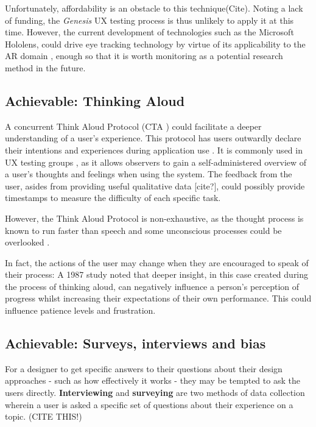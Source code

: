 \documentclass{scrartcl}
\begin{document}
Unfortunately, affordability is an obstacle to this technique(Cite). Noting a lack of funding, the \textit{Genesis} UX testing process is thus unlikely to apply it at this time. However, the current development of technologies such as the Microsoft Hololens, could drive eye tracking technology by virtue of its applicability to the AR domain \cite{majaranta_chapter_2014}, enough so that it is worth monitoring as a potential research method in the future.

\subsection{Achievable: Thinking Aloud}
A concurrent Think Aloud Protocol (CTA \cite{cooke_assessing_2010}) could facilitate a deeper understanding of a user's experience. This protocol has users outwardly declare their intentions and experiences during application use \cite{haak_exploring_2003} \cite{cooke_assessing_2010}. It is commonly used in UX testing groups \cite{mcdonald_exploring_2012}, as it allows observers to gain a self-administered overview of a user's thoughts and feelings when using the system. The feedback from the user, asides from providing useful qualitative data [cite?], could possibly provide timestamps to measure the difficulty of each specific task.

However, the Think Aloud Protocol is non-exhaustive, as the thought process is known to run faster than speech \cite{e._fonteyn_description_1993} and some unconscious processes could be overlooked \cite{cooke_assessing_2010}.

In fact, the actions of the user may change when they are encouraged to speak of their process: A 1987 study \cite{metcalfe_intuition_1987} noted that deeper insight, in this case created during the process of thinking aloud, can negatively influence a person's perception of progress whilst increasing their expectations of their own performance. This could influence patience levels and frustration.

\subsection{Achievable: Surveys, interviews and bias}
For a designer to get specific answers to their questions about their design approaches - such as how effectively it works - they may be tempted to ask the users directly. \textbf{Interviewing} and \textbf{surveying} are two methods of data collection wherein a user is asked a specific set of questions about their experience on a topic. (CITE THIS!)
\end{document}

